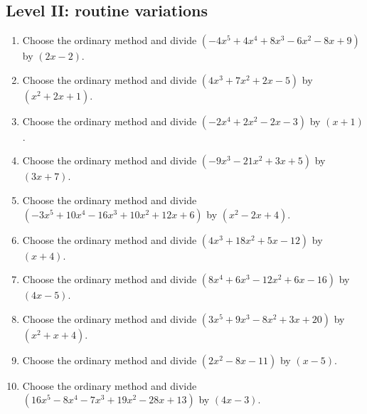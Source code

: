 \documentclass[11pt,oneside]{book}
\begin{document}
\subsection*{Level II: routine variations}
\begin{enumerate}[leftmargin=*,label=\textbf{\arabic*.},itemsep=0.65\baselineskip]
\item Choose the ordinary method and divide $(- 4 x^{5} + 4 x^{4} + 8 x^{3} - 6 x^{2} - 8 x + 9)$ by $(2 x - 2)$.
\item Choose the ordinary method and divide $(4 x^{3} + 7 x^{2} + 2 x - 5)$ by $(x^{2} + 2 x + 1)$.
\item Choose the ordinary method and divide $(- 2 x^{4} + 2 x^{2} - 2 x - 3)$ by $(x + 1)$.
\item Choose the ordinary method and divide $(- 9 x^{3} - 21 x^{2} + 3 x + 5)$ by $(3 x + 7)$.
\item Choose the ordinary method and divide $(- 3 x^{5} + 10 x^{4} - 16 x^{3} + 10 x^{2} + 12 x + 6)$ by $(x^{2} - 2 x + 4)$.
\item Choose the ordinary method and divide $(4 x^{3} + 18 x^{2} + 5 x - 12)$ by $(x + 4)$.
\item Choose the ordinary method and divide $(8 x^{4} + 6 x^{3} - 12 x^{2} + 6 x - 16)$ by $(4 x - 5)$.
\item Choose the ordinary method and divide $(3 x^{5} + 9 x^{3} - 8 x^{2} + 3 x + 20)$ by $(x^{2} + x + 4)$.
\item Choose the ordinary method and divide $(2 x^{2} - 8 x - 11)$ by $(x - 5)$.
\item Choose the ordinary method and divide $(16 x^{5} - 8 x^{4} - 7 x^{3} + 19 x^{2} - 28 x + 13)$ by $(4 x - 3)$.
\end{enumerate}
\end{document}
